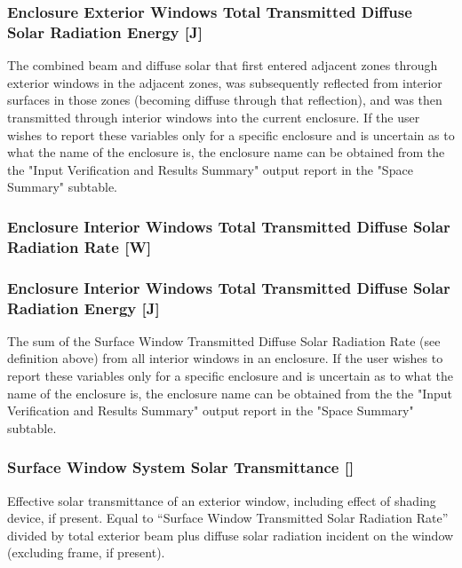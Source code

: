 \subsubsection{Enclosure Exterior Windows Total Transmitted Diffuse Solar Radiation Energy {[}J{]}}\label{zone-exterior-windows-total-transmitted-diffuse-solar-radiation-energy-j}

The combined beam and diffuse solar that first entered adjacent zones through exterior windows in the adjacent zones, was subsequently reflected from interior surfaces in those zones (becoming diffuse through that reflection), and was then transmitted through interior windows into the current enclosure. If the user wishes to report these variables only for a specific enclosure and is uncertain as to what the name of the enclosure is, the enclosure name can be obtained from the the "Input Verification and Results Summary" output report in the "Space Summary" subtable.

\subsubsection{Enclosure Interior Windows Total Transmitted Diffuse Solar Radiation Rate {[}W{]}}\label{zone-interior-windows-total-transmitted-diffuse-solar-radiation-rate-w}

\subsubsection{Enclosure Interior Windows Total Transmitted Diffuse Solar Radiation Energy {[}J{]}}\label{zone-interior-windows-total-transmitted-diffuse-solar-radiation-energy-j}

The sum of the Surface Window Transmitted Diffuse Solar Radiation Rate (see definition above) from all interior windows in an enclosure. If the user wishes to report these variables only for a specific enclosure and is uncertain as to what the name of the enclosure is, the enclosure name can be obtained from the the "Input Verification and Results Summary" output report in the "Space Summary" subtable.

\subsubsection{Surface Window System Solar Transmittance {[]}}\label{surface-window-system-solar-transmittance}

Effective solar transmittance of an exterior window, including effect of shading device, if present. Equal to ``Surface Window Transmitted Solar Radiation Rate'' divided by total exterior beam plus diffuse solar radiation incident on the window (excluding frame, if present).

